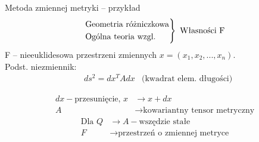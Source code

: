   \begin{frame}{Metoda zmiennej metryki -- przykład}
    \begin{equation*}
      \begin{rcases}
        \text{Geometria różniczkowa} \\
        \text{Ogólna teoria wzgl.}
      \end{rcases}
      \text{ Własności F}
    \end{equation*}
    F -- nieeuklidesowa przestrzeni zmiennych $x=(x_1, x_2, ..., x_n)$.\\

    Podst. niezmiennik:
    \begin{equation*}
      \begin{aligned}
        &ds^2 = dx^T A dx &\text{(kwadrat elem. długości)}
      \end{aligned}
    \end{equation*}

    \begin{equation*}
      \begin{aligned}
        dx - \text{przesunięcie, } x &\rightarrow x + dx \\
        A &\rightarrow \text{kowariantny tensor metryczny}
      \end{aligned}
    \end{equation*}
    \begin{equation*}
      \begin{aligned}
        \text{Dla } Q &\rightarrow A - \text{wszędzie stałe}\\
                    F &\rightarrow \text{przestrzeń o zmiennej metryce}
      \end{aligned}
    \end{equation*}
  \end{frame}
